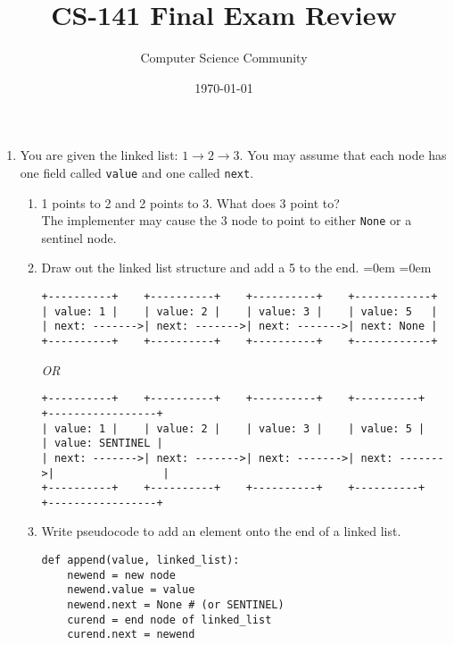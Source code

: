 \documentclass[11pt]{article}
\author{Computer Science Community}
\title{CS-141 Final Exam Review}
\date{\today}
\newenvironment{answer}{\large\lstset{basicstyle=\tiny\ttfamily}\color{white}}{}
\newenvironment{answer}{\large\lstset{basicstyle=\large\ttfamily}\color{red}}{}
\begin{document}
\header

\begin{enumerate}

\section*{Linked Lists}
    \item You are given the linked list: $1 \rightarrow 2 \rightarrow 3$.  You may assume that each node has one field called \texttt{value} and one called \texttt{next}.
        \begin{enumerate}
            \item 1 points to 2 and 2 points to 3. What does 3 point to? \\
                \begin{answer}
				The implementer may cause the 3 node to point to either \texttt{None} or a sentinel node.
				\end{answer}
            \item Draw out the linked list structure and add a 5 to the end.
				\begin{answer}
				\leftmargin=0em
				\itemindent=0em
				{ \small
				\begin{verbatim}
+----------+    +----------+    +----------+    +------------+
| value: 1 |    | value: 2 |    | value: 3 |    | value: 5   |
| next: ------->| next: ------->| next: ------->| next: None |
+----------+    +----------+    +----------+    +------------+
				\end{verbatim}
				\textit{OR}
				\begin{verbatim}
+----------+    +----------+    +----------+    +----------+    +-----------------+
| value: 1 |    | value: 2 |    | value: 3 |    | value: 5 |    | value: SENTINEL |
| next: ------->| next: ------->| next: ------->| next: ------->|                 |
+----------+    +----------+    +----------+    +----------+    +-----------------+
				\end{verbatim} }
				\end{answer}
            \item Write pseudocode to add an element onto the end of a linked list.
				\begin{answer}
				\begin{lstlisting}
def append(value, linked_list):
	newend = new node
	newend.value = value
	newend.next = None # (or SENTINEL)
	curend = end node of linked_list
	curend.next = newend

\end{lstlisting}
\end{answer}
\end{enumerate}
\end{enumerate}
\end{document}
